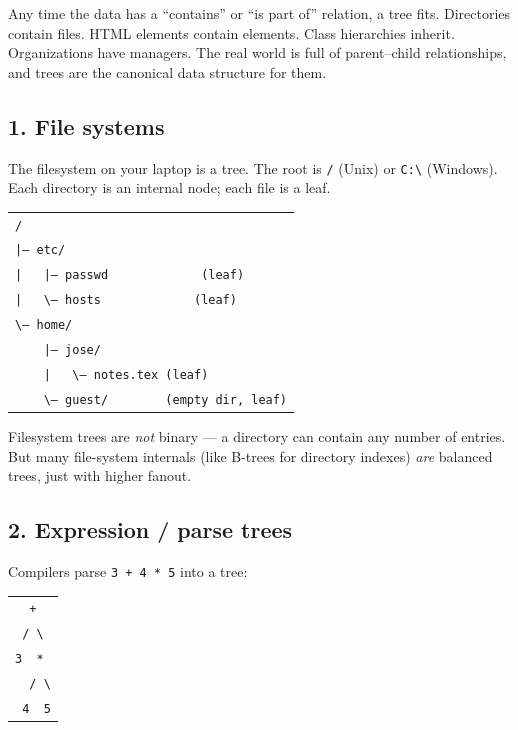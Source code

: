 \documentclass[11pt]{article}
\begin{document}
\begin{ideabox}
Any time the data has a ``contains'' or ``is part of'' relation,
a tree fits. Directories contain files. HTML elements contain
elements. Class hierarchies inherit. Organizations have managers.
The real world is full of parent--child relationships, and trees
are the canonical data structure for them.
\end{ideabox}

\subsection*{1. File systems}

The filesystem on your laptop is a tree. The root is \texttt{/}
(Unix) or \texttt{C:\textbackslash{}} (Windows). Each directory
is an internal node; each file is a leaf.

\begin{center}
\begin{tabular}{l}
\texttt{/} \\
\texttt{|-- etc/} \\
\texttt{|\ \ \ |-- passwd\ \ \ \ \ \ \ \ \ \ \ \ \ (leaf)} \\
\texttt{|\ \ \ \textbackslash{}-- hosts\ \ \ \ \ \ \ \ \ \ \ \ \ (leaf)} \\
\texttt{\textbackslash{}-- home/} \\
\texttt{\ \ \ \ |-- jose/} \\
\texttt{\ \ \ \ |\ \ \ \textbackslash{}-- notes.tex\ (leaf)} \\
\texttt{\ \ \ \ \textbackslash{}-- guest/\ \ \ \ \ \ \ \ (empty dir, leaf)} \\
\end{tabular}
\end{center}

Filesystem trees are \emph{not} binary --- a directory can contain
any number of entries. But many file-system internals (like
B-trees for directory indexes) \emph{are} balanced trees, just
with higher fanout.

\subsection*{2. Expression / parse trees}

Compilers parse \texttt{3 + 4 * 5} into a tree:

\begin{center}
\begin{tabular}{c}
\texttt{\ \ +\ \ } \\
\texttt{\ /\ \textbackslash{}\ } \\
\texttt{3\ \ *\ } \\
\texttt{\ \ / \textbackslash{}} \\
\texttt{\ 4\ \ 5} \\
\end{tabular}
\end{center}
\end{document}
